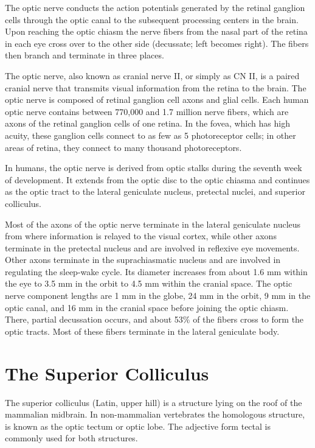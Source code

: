 The optic nerve conducts the action potentials generated by the retinal ganglion cells through the optic canal to the subsequent processing centers in the brain. Upon reaching the optic chiasm the nerve fibers from the nasal part of the retina in each eye cross over to the other side (decussate; left becomes right). The fibers then branch and terminate in three places.

The optic nerve, also known as cranial nerve II, or simply as CN II, is a paired cranial nerve that transmits visual information from the retina to the brain. The optic nerve is composed of retinal ganglion cell axons and glial cells. Each human optic nerve contains between 770,000 and 1.7 million nerve fibers, which are axons of the retinal ganglion cells of one retina. In the fovea, which has high acuity, these ganglion cells connect to as few as 5 photoreceptor cells; in other areas of retina, they connect to many thousand photoreceptors.

In humans, the optic nerve is derived from optic stalks during the seventh week of development. It extends from the optic disc to the optic chiasma and continues as the optic tract to the lateral geniculate nucleus, pretectal nuclei, and superior colliculus.

Most of the axons of the optic nerve terminate in the lateral geniculate nucleus from where information is relayed to the visual cortex, while other axons terminate in the pretectal nucleus and are involved in reflexive eye movements. Other axons terminate in the suprachiasmatic nucleus and are involved in regulating the sleep-wake cycle. Its diameter increases from about 1.6 mm within the eye to 3.5 mm in the orbit to 4.5 mm within the cranial space. The optic nerve component lengths are 1 mm in the globe, 24 mm in the orbit, 9 mm in the optic canal, and 16 mm in the cranial space before joining the optic chiasm. There, partial decussation occurs, and about 53\% of the fibers cross to form the optic tracts. Most of these fibers terminate in the lateral geniculate body.

\hypertarget{the-superior-colliculus}{%
\section{The Superior Colliculus}\label{the-superior-colliculus}}

The superior colliculus (Latin, upper hill) is a structure lying on the roof of the mammalian midbrain. In non-mammalian vertebrates the homologous structure, is known as the optic tectum or optic lobe. The adjective form tectal is commonly used for both structures.


